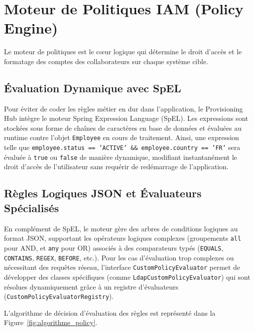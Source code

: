 \section{Moteur de Politiques IAM (Policy Engine)}
Le moteur de politiques est le cœur logique qui détermine le droit d'accès et le formatage des comptes des collaborateurs sur chaque système cible.

\subsection{Évaluation Dynamique avec SpEL}
Pour éviter de coder les règles métier en dur dans l'application, le Provisioning Hub intègre le moteur Spring Expression Language (SpEL). Les expressions sont stockées sous forme de chaînes de caractères en base de données et évaluées au runtime contre l'objet \texttt{Employee} en cours de traitement. 
Ainsi, une expression telle que \texttt{employee.status == 'ACTIVE' \&\& employee.country == 'FR'} sera évaluée à \texttt{true} ou \texttt{false} de manière dynamique, modifiant instantanément le droit d'accès de l'utilisateur sans requérir de redémarrage de l'application.

\subsection{Règles Logiques JSON et Évaluateurs Spécialisés}
En complément de SpEL, le moteur gère des arbres de conditions logiques au format JSON, supportant les opérateurs logiques complexes (groupements \texttt{all} pour AND, et \texttt{any} pour OR) associés à des comparateurs typés (\texttt{EQUALS}, \texttt{CONTAINS}, \texttt{REGEX}, \texttt{BEFORE}, etc.). 
Pour les cas d'évaluation trop complexes ou nécessitant des requêtes réseau, l'interface \texttt{CustomPolicyEvaluator} permet de développer des classes spécifiques (comme \texttt{LdapCustomPolicyEvaluator}) qui sont résolues dynamiquement grâce à un registre d'évaluateurs (\texttt{CustomPolicyEvaluatorRegistry}).

L'algorithme de décision d'évaluation des règles est représenté dans la Figure~\ref{fig:algorithme_policy}.

